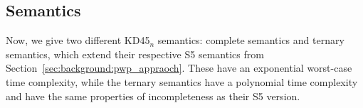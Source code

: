 





\subsection{Semantics}
Now, we give two different KD45$_n$ semantics: complete semantics and ternary semantics, which extend their respective S5 semantics from Section~\ref{sec:background:pwp_appraoch}.
These have an exponential worst-case time complexity, while the ternary semantics have a polynomial time complexity and have the same properties of incompleteness as their S5 version.




